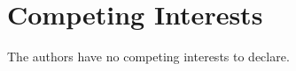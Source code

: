 \documentclass{article}
\begin{document}
\section*{Competing Interests}
The authors have no competing interests to declare.






\end{document}
